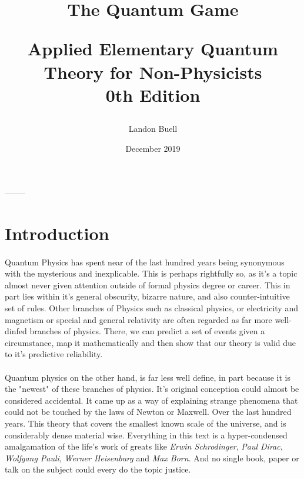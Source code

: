 \documentclass[12pt,letterpaper]{book}
\begin{document}

\title{
\begin{Huge}
The Quantum Game\\
\end{Huge}
\vspace*{5mm}
\Large Applied Elementary Quantum Theory for Non-Physicists \\
0th Edition}
\author{Landon Buell}
\date{December 2019}
\maketitle



\begin{center}
--------
\end{center}


\tableofcontents
\pagebreak


\section*{Introduction}
\paragraph*{}Quantum Physics has spent near of the last hundred years being synonymous with the mysterious and inexplicable. This is perhaps rightfully so, as it's a topic almost never given attention outside of formal physics degree or career. This in part lies within it's general obscurity, bizarre nature, and also counter-intuitive set of rules. Other branches of Physics such as classical physics, or electricity and magnetism or special and general relativity are often regarded as far more well-dinfed branches of physics. There, we can predict a set of events given a circumstance, map it mathematically and then show that our theory is valid due to it's predictive reliability.
\paragraph*{}Quantum physics on the other hand, is far less well define, in part because it is the "newest" of these branches of physics. It's original conception could almost be considered accidental. It came up as a way of explaining strange phenomena that could not be touched by the laws of Newton or Maxwell. Over the last hundred years. This theory that covers the smallest known scale of the universe, and is considerably dense material wise. Everything in this text is a hyper-condensed amalgamation of the life's work of greats like \textit{Erwin Schrodinger}, \textit{Paul Dirac}, \textit{Wolfgang Pauli}, \textit{Werner Heisenburg} and \textit{Max Born}. And no single book, paper or talk on the subject could every do the topic justice.
\end{document}
